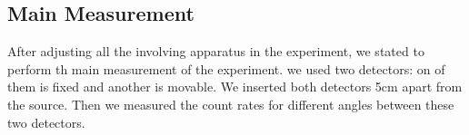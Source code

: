 \subsection{Main Measurement}
After adjusting all the involving apparatus in the experiment, we stated to perform th main measurement of the experiment. we used two detectors: on of them is fixed and another is movable. We inserted both detectors 5cm apart from the source. Then we measured the count rates for different angles between these two detectors.



